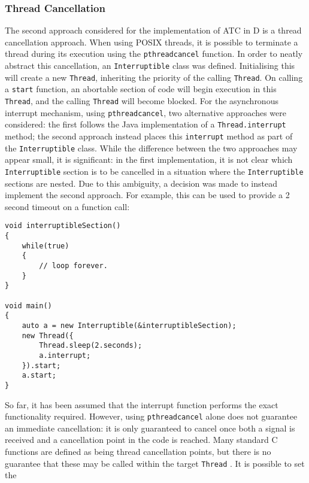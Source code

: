\subsubsection*{Thread Cancellation}
The second approach considered for the implementation of ATC in D is a thread 
cancellation approach. When using POSIX threads, it is possible to terminate a 
thread during its execution using the \texttt{pthread\textunderscore{}cancel} function. 
In order to neatly abstract this cancellation, an \texttt{Interruptible} class
was defined.
Initialising this will create a new \texttt{Thread}, 
inheriting the priority of the calling \texttt{Thread}. 
On calling a \texttt{start} function, an abortable section of code will begin 
execution in this \texttt{Thread}, and the calling
\texttt{Thread} will become blocked. 
For the asynchronous interrupt mechanism, using
\texttt{pthread\textunderscore{}cancel},
two alternative approaches were considered:
the first follows the Java implementation of a 
\texttt{Thread.interrupt} method; 
the second approach instead places this \texttt{interrupt} method as part of the 
\texttt{Interruptible} class. 
While the difference between the two approaches may appear small, it is significant: 
in the first implementation, it is not clear which \texttt{Interruptible}
section is to be cancelled in a situation where the \texttt{Interruptible} 
sections are nested. 
Due to this ambiguity, a decision was made to instead implement the second
approach. 
For example, this can be used to provide a 2 second timeout on a function call:
\begin{lstlisting}[basicstyle=\small]
void interruptibleSection()
{
    while(true)
    {
        // loop forever.
    }
}

void main()
{
    auto a = new Interruptible(&interruptibleSection); 
    new Thread({
        Thread.sleep(2.seconds);
        a.interrupt;
    }).start;
    a.start; 
}
\end{lstlisting}
\par\bigskip\noindent
So far, it has been assumed that the interrupt function performs the exact 
functionality required. 
However, using \texttt{pthread\textunderscore{}cancel} alone does not guarantee 
an immediate cancellation: it is only guaranteed 
to cancel once both a signal is received and a cancellation point in the code 
is reached. 
Many standard C functions are defined as being thread cancellation points, but 
there is no guarantee that these may be called within the target
\texttt{Thread} 
\cite{pthread-cancel-points}. It is possible to set the 
